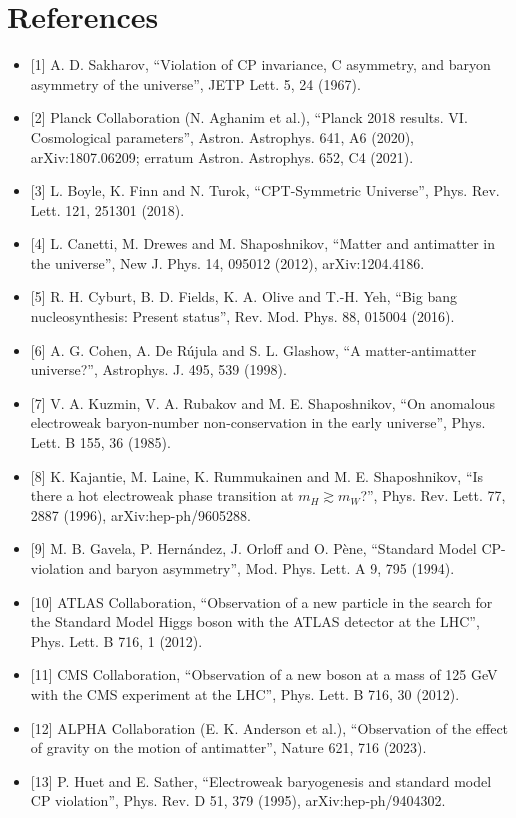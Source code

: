 \documentclass[11pt]{article}
\begin{document}
\section{References}

\begin{itemize}
\item {}[1] A. D. Sakharov, ``Violation of CP invariance, C asymmetry, and baryon asymmetry of the universe'', JETP Lett. 5, 24 (1967).
\item {}[2] Planck Collaboration (N. Aghanim et al.), ``Planck 2018 results. VI. Cosmological parameters'', Astron. Astrophys. 641, A6 (2020), arXiv:1807.06209; erratum Astron. Astrophys. 652, C4 (2021).
\item {}[3] L. Boyle, K. Finn and N. Turok, ``CPT-Symmetric Universe'', Phys. Rev. Lett. 121, 251301 (2018).
\item {}[4] L. Canetti, M. Drewes and M. Shaposhnikov, ``Matter and antimatter in the universe'', New J. Phys. 14, 095012 (2012), arXiv:1204.4186.
\item {}[5] R. H. Cyburt, B. D. Fields, K. A. Olive and T.-H. Yeh, ``Big bang nucleosynthesis: Present status'', Rev. Mod. Phys. 88, 015004 (2016).
\item {}[6] A. G. Cohen, A. De Rújula and S. L. Glashow, ``A matter-antimatter universe?'', Astrophys. J. 495, 539 (1998).
\item {}[7] V. A. Kuzmin, V. A. Rubakov and M. E. Shaposhnikov, ``On anomalous electroweak baryon-number non-conservation in the early universe'', Phys. Lett. B 155, 36 (1985).
\item {}[8] K. Kajantie, M. Laine, K. Rummukainen and M. E. Shaposhnikov, ``Is there a hot electroweak phase transition at $m_H\gtrsim m_W$?'', Phys. Rev. Lett. 77, 2887 (1996), arXiv:hep-ph/9605288.
\item {}[9] M. B. Gavela, P. Hernández, J. Orloff and O. Pène, ``Standard Model CP-violation and baryon asymmetry'', Mod. Phys. Lett. A 9, 795 (1994).
\item {}[10] ATLAS Collaboration, ``Observation of a new particle in the search for the Standard Model Higgs boson with the ATLAS detector at the LHC'', Phys. Lett. B 716, 1 (2012).
\item {}[11] CMS Collaboration, ``Observation of a new boson at a mass of 125 GeV with the CMS experiment at the LHC'', Phys. Lett. B 716, 30 (2012).
\item {}[12] ALPHA Collaboration (E. K. Anderson et al.), ``Observation of the effect of gravity on the motion of antimatter'', Nature 621, 716 (2023).
\item {}[13] P. Huet and E. Sather, ``Electroweak baryogenesis and standard model CP violation'', Phys. Rev. D 51, 379 (1995), arXiv:hep-ph/9404302.
\end{itemize}
\end{document}
